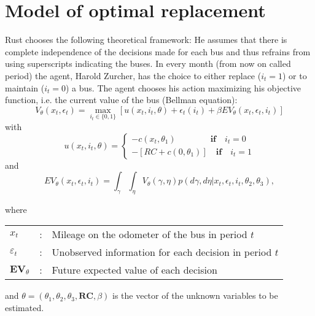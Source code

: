 \documentclass[a4paper,12pt,bold]{scrartcl}
\begin{document}
\section{Model of optimal replacement}
Rust chooses the following theoretical framework: He assumes that there is complete independence of the decisions made for each bus and thus refrains from using superscripts indicating the buses. In every month (from now on called period) the agent, Harold Zurcher, has the choice to either replace (\(i_t = 1 \)) or to maintain (\(i_t = 0\)) a bus. The agent chooses his action maximizing his objective function, i.e. the current value of the bus (Bellman equation):
  \begin{equation}
    V_{\theta}(x_t, \epsilon_t) = \max_{i_t \in \{0, 1\}} [ u(x_t, i_t, \theta) + \epsilon_t (i_t) + \beta EV_{ \theta }( x_t, \epsilon_t, i_t) ]
  \end{equation}
with
\begin{equation}
  u(x_t,i_t, \theta)=
  \begin{cases}
  -c(x_t, \theta_1)\qquad \qquad  \textbf{if} \quad i_t=0 \\
  -[RC + c(0, \theta_1)]\quad \textbf{if} \quad i_t=1
  \end{cases}
\end{equation}
and
\begin{equation}
  EV_{\theta}(x_t, \epsilon_t, i_t) = \int_{\gamma}\int_{\eta} V_{\theta}(\gamma, \eta)p(d\gamma, d\eta | x_t, \epsilon_t, i_t, \theta_2, \theta_3),
\end{equation}

  \bigskip
where \\
\begin{table}[htbp]
    \centering %
    \begin{tabular}{l c p{10cm} }
        $x_t$ & : & Mileage on the odometer of the bus in period $t$\\
        $\varepsilon_t$ & : & Unobserved information for each decision in period $t$\\
        $\mathbf{EV}_{\theta}$ & : & Future expected value of each decision\\
    \end{tabular}
\end{table}

and $\theta = \left(\theta_1, \theta_2, \theta_3, \mathbf{RC}, \beta \right)$ is the vector of the unknown variables to be estimated.
\end{document}
